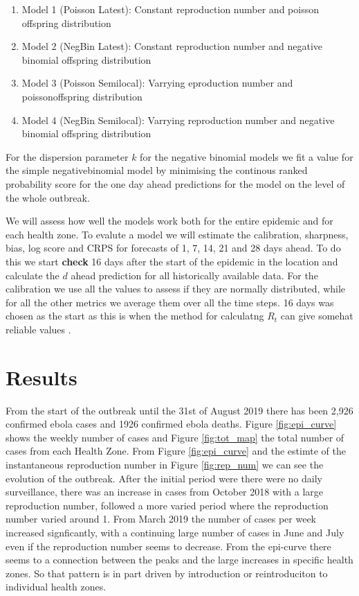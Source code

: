 \documentclass[12pt]{article}
\begin{document}
\begin{enumerate}
\item{Model 1 (Poisson Latest): Constant reproduction number and poisson offspring distribution}
\item{Model 2 (NegBin Latest): Constant reproduction number and negative binomial offspring distribution}
\item{Model 3 (Poisson Semilocal): Varrying eproduction number and poissonoffspring distribution}
\item{Model 4 (NegBin Semilocal): Varrying reproduction number and negative binomial offspring distribution}
\end{enumerate}

For the dispersion parameter $k$ for the negative binomial models we fit a value for the simple negativebinomial model by minimising the continous ranked probability score for the one day ahead predictions for the model on the level of the whole outbreak. 

We will assess how well the models work both for the entire epidemic and for each health zone. To evalute a model we will estimate the calibration, sharpness, bias, log score and CRPS for forecasts of 1, 7, 14, 21 and 28 days ahead. To do this we start { \bf check } 16 days after the start of the epidemic in the location and calculate the $d$ ahead prediction for all historically available data. For the calibration we use all the values to assess if they are normally distributed, while for all the other metrics we average them over all the time steps. 16 days was chosen as the start as this is when the method for calculatng $R_t$ can give somehat reliable values \cite{coriNewFrameworkSoftware2013}. 



\section{Results}
From the start of the outbreak until the 31st of August 2019 there has been 2,926 confirmed ebola cases and 1926 confirmed ebola deaths. Figure \ref{fig:epi_curve} shows the weekly number of cases and Figure \ref{fig:tot_map} the total number of cases from each Health Zone. From Figure \ref{fig:epi_curve} and the estimte of the instantaneous reproduction number in Figure \ref{fig:rep_num} we can see the evolution of the outbreak. After the initial period were there were no daily surveillance, there was an increase in cases from October 2018 with a large reproduction number, followed a more varied period where the reproduction number varied around 1. From March 2019 the number of cases per week increased signficantly, with a continuing large number of cases in June and July even if the reproduction number seems to decrease. From the epi-curve there seems to a connection between the peaks and the large increases in specific health zones. So that pattern is in part driven by introduction or reintroduciton to individual health zones.
\end{document}
